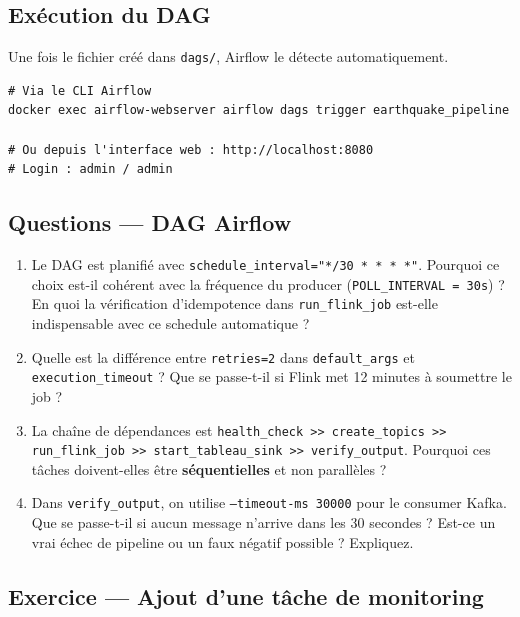 \documentclass[12pt,a4paper]{article}
\begin{document}
\subsection{Exécution du DAG}

Une fois le fichier créé dans \texttt{dags/}, Airflow le détecte automatiquement.

\begin{lstlisting}[style=bash, caption={Déclenchement manuel du DAG}]
# Via le CLI Airflow
docker exec airflow-webserver airflow dags trigger earthquake_pipeline

# Ou depuis l'interface web : http://localhost:8080
# Login : admin / admin
\end{lstlisting}

\subsection*{Questions --- DAG Airflow}

\begin{enumerate}[label=\textbf{Q\arabic*.}]
  \item Le DAG est planifié avec \texttt{schedule\_interval="*/30 * * * *"}.
        Pourquoi ce choix est-il cohérent avec la fréquence du producer (\texttt{POLL\_INTERVAL = 30s}) ?
        En quoi la vérification d'idempotence dans \texttt{run\_flink\_job} est-elle
        indispensable avec ce schedule automatique ?
  \item Quelle est la différence entre \texttt{retries=2} dans \texttt{default\_args}
        et \texttt{execution\_timeout} ? Que se passe-t-il si Flink met
        12 minutes à soumettre le job ?
  \item La chaîne de dépendances est \texttt{health\_check >> create\_topics >> run\_flink\_job >> start\_tableau\_sink >> verify\_output}.
        Pourquoi ces tâches doivent-elles être \textbf{séquentielles} et non parallèles ?
  \item Dans \texttt{verify\_output}, on utilise \texttt{--timeout-ms 30000} pour le consumer Kafka.
        Que se passe-t-il si aucun message n'arrive dans les 30 secondes ?
        Est-ce un vrai échec de pipeline ou un faux négatif possible ? Expliquez.
\end{enumerate}

\subsection*{Exercice --- Ajout d'une tâche de monitoring}
\end{document}

